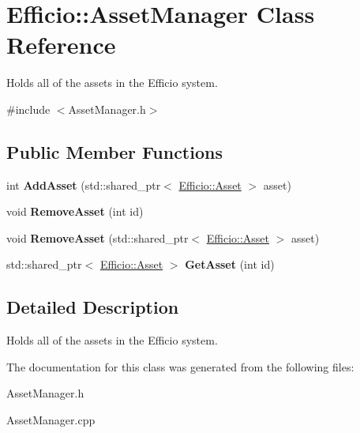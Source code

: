 \hypertarget{class_efficio_1_1_asset_manager}{}\section{Efficio\+:\+:Asset\+Manager Class Reference}
\label{class_efficio_1_1_asset_manager}


Holds all of the assets in the Efficio system.  




{\ttfamily \#include $<$Asset\+Manager.\+h$>$}

\subsection*{Public Member Functions}
\begin{DoxyCompactItemize}
\item 
int {\bfseries Add\+Asset} (std\+::shared\+\_\+ptr$<$ \hyperlink{class_efficio_1_1_asset}{Efficio\+::\+Asset} $>$ asset)\hypertarget{class_efficio_1_1_asset_manager_ab6750d59f846587f1df3d2b1ed328517}{}\label{class_efficio_1_1_asset_manager_ab6750d59f846587f1df3d2b1ed328517}

\item 
void {\bfseries Remove\+Asset} (int id)\hypertarget{class_efficio_1_1_asset_manager_afdaf11f849d6197e28cc38c67aa3cebf}{}\label{class_efficio_1_1_asset_manager_afdaf11f849d6197e28cc38c67aa3cebf}

\item 
void {\bfseries Remove\+Asset} (std\+::shared\+\_\+ptr$<$ \hyperlink{class_efficio_1_1_asset}{Efficio\+::\+Asset} $>$ asset)\hypertarget{class_efficio_1_1_asset_manager_a82bf5905223729b7b6285594918aec24}{}\label{class_efficio_1_1_asset_manager_a82bf5905223729b7b6285594918aec24}

\item 
std\+::shared\+\_\+ptr$<$ \hyperlink{class_efficio_1_1_asset}{Efficio\+::\+Asset} $>$ {\bfseries Get\+Asset} (int id)\hypertarget{class_efficio_1_1_asset_manager_a6d4f70a098f18a7106d5038f8446f846}{}\label{class_efficio_1_1_asset_manager_a6d4f70a098f18a7106d5038f8446f846}

\end{DoxyCompactItemize}


\subsection{Detailed Description}
Holds all of the assets in the Efficio system. 

The documentation for this class was generated from the following files\+:\begin{DoxyCompactItemize}
\item 
Asset\+Manager.\+h\item 
Asset\+Manager.\+cpp\end{DoxyCompactItemize}
